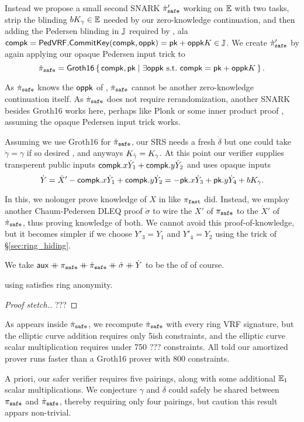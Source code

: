 Instead we propose a small second SNARK $\dot{\pi}_{\mathtt{safe}}'$ working on ${\mathbb{E}}$
with two tasks, strip the blinding $b K_\gamma \in {\mathbb{E}}$ needed
by our zero-knowledge continuation, and then adding the Pedersen blinding
in ${\mathbb{J}}$ required by \PedVRF, ala
 $\mathsf{compk} = {\mathsf{PedVRF}}.{\mathsf{CommitKey}}(\mathsf{compk},\mathsf{oppk}) = \mathsf{pk} + \mathsf{oppk} K \in {\mathbb{J}}$.
We create $\dot{\pi}_{\mathtt{safe}}'$ by again applying our opaque Pedersen input trick to
$$ \pisafedot = \rrSNARK \Setst{ \compk, \pk }{
 \exists \openpk \textrm{\ s.t.\ } \compk = \pk + \openpk \genB
} \mathperiod $$

As $\dot{\pi}_{\mathtt{safe}}$ knows the $\mathsf{oppk}$ of \PedVRF,
$\dot{\pi}_{\mathtt{safe}}$ cannot be another zero-knowledge continuation itself.
As $\dot{\pi}_{\mathtt{safe}}$ does not require rerandomization, another SNARK besides
Groth16 \cite{groth16} works here, perhaps like Plonk \cite{plonk} or
some inner product proof \cite{bootle,bulletproofs},
 assuming the opaque Pedersen input trick works.

Assuming we use Groth16 \cite{groth16} for $\dot{\pi}_{\mathtt{safe}}$,
our SRS needs a fresh $\dot{\delta}$ but one could take
$\dot{\gamma} = \gamma$ if so desired \cite{???}, and anyways
$K_{\dot{\gamma}} = K_{\gamma}$.
At this point our verifier supplies transperent public inputs
 $\mathsf{compk}.x \dot{Y}_1 + \mathsf{compk}.y \dot{Y}_2$ and uses opaque inputs
$$ \dot{Y} = \dot{X}' - \mathsf{compk}.x \dot{Y}_1 + \mathsf{compk}.y \dot{Y}_2 =
- \mathsf{pk}.x \dot{Y}_3 + \mathsf{pk}.y \dot{Y}_4 + b K_{\dot{\gamma}} . $$

In this, we nolonger prove knowledge of $X$ in \PedVRF like $\pi_{\mathtt{fast}}$ did.
Instead, we employ another Chaum-Pedersen DLEQ proof $\dot{\sigma}$ to wire
 the $X'$ of $\pi_{\mathtt{safe}}$ to the $\dot{X}'$ of $\dot{\pi}_{\mathtt{safe}}$,
 thus proving knowledge of both.
We cannot avoid this proof-of-knowledge, but it becomes simpler if
we choose $Y'_3 = Y_1$ and $Y'_4 = Y_2$ using the trick of \S\ref{sec:ring_hiding}.

We take $\aux \doubleplus \pisafe \doubleplus \pisafedot
 \doubleplus \dot{\sigma} \doubleplus \dot{Y}$
 to be the \aux of \PedVRF of course.

\begin{proposition}\label{prop:pisafe_anonymity}
\rVRF using \pisafe satisfies ring anonymity.
\end{proposition}

\begin{proof}[Proof stetch.]
???
\end{proof}


As \openpk appears inside $\dot{\pi}_{\mathtt{safe}}$, we recompute $\dot{\pi}_{\mathtt{safe}}$ with
every ring VRF signature, but the elliptic curve addition requires
only 5ish constraints, and the elliptic curve scalar multiplication
requires under 750 ??? constraints. 
All told our amortized prover runs faster than a Groth16 prover
with 800 constraints.

A priori, our safer verifier requires five pairings, along with
some additional ${\mathbb{E}}_1$ scalar multiplications.
We conjecture $\gamma$ and $\delta$ could safely be shared between
$\pi_{\mathtt{safe}}$ and $\dot{\pi}_{\mathtt{safe}}$, thereby requiring only four pairings,
but caution this result appars non-trivial.


